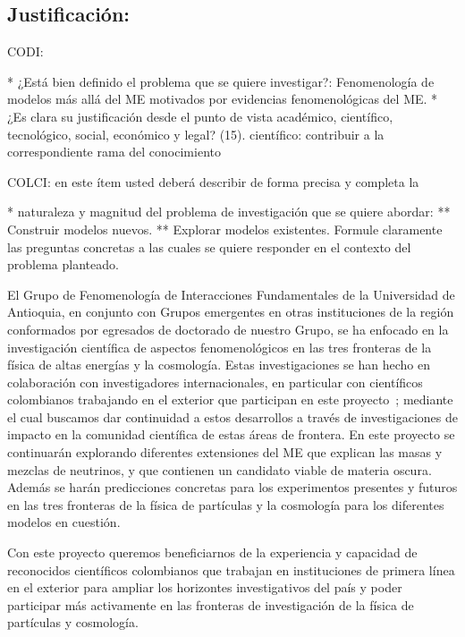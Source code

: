 \subsection{Justificación:                                 }
\begin{instrucciones}
  CODI: 

  * ¿Está bien definido el problema que se quiere investigar?:
  Fenomenología de modelos más allá del ME motivados por evidencias
  fenomenológicas del ME.  
  * ¿Es clara su justificación desde el punto de vista académico,
  científico, tecnológico, social, económico y legal? (15).
  científico: contribuir a la correspondiente rama del conocimiento

  COLCI: en este ítem usted deberá describir de forma precisa y completa la
  
  * naturaleza y magnitud del problema de investigación que se quiere
  abordar:
  ** Construir modelos nuevos.
  ** Explorar modelos existentes.
  Formule claramente las preguntas concretas a las cuales se
  quiere responder en el contexto del problema planteado.
\end{instrucciones}
El Grupo de Fenomenología de Interacciones Fundamentales de la
Universidad de Antioquia, en conjunto con Grupos emergentes en
otras instituciones de la región conformados por egresados de
doctorado de nuestro Grupo, se ha enfocado en la investigación
científica de aspectos fenomenológicos en las tres fronteras de la
física de altas energías y la cosmología. Estas investigaciones se han
hecho en colaboración con investigadores internacionales, en
particular con científicos colombianos trabajando en el exterior que
participan en este
proyecto~\cite{Sierra:2009zq,Sierra:2008wj,AristizabalSierra:2008ye,Choi:2010jt,AristizabalSierra:2009bh};
mediante el cual buscamos dar continuidad a estos desarrollos a través
de investigaciones de impacto en la comunidad científica de estas
áreas de frontera. En este proyecto se continuarán explorando
diferentes extensiones del ME que explican las masas y
mezclas de neutrinos, y que contienen un candidato viable de materia oscura.
Además se harán predicciones concretas para los experimentos presentes y futuros
en las tres fronteras de la física de partículas y la cosmología para los
diferentes modelos en cuestión.

Con este proyecto queremos beneficiarnos de la experiencia y capacidad
de reconocidos científicos colombianos que trabajan en instituciones
de primera línea en el exterior para ampliar los horizontes
investigativos del país y poder participar más activamente en las
fronteras de investigación de la física de partículas y cosmología.


